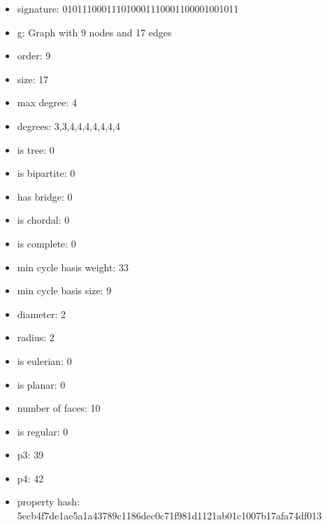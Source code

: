 \newpage
\begin{figure}
\end{figure}
\begin{itemize}
\item signature: 010111000111010001110001100001001011
\item g: Graph with 9 nodes and 17 edges
\item order: 9
\item size: 17
\item max degree: 4
\item degrees: 3,3,4,4,4,4,4,4,4
\item is tree: 0
\item is bipartite: 0
\item has bridge: 0
\item is chordal: 0
\item is complete: 0
\item min cycle basis weight: 33
\item min cycle basis size: 9
\item diameter: 2
\item radius: 2
\item is eulerian: 0
\item is planar: 0
\item number of faces: 10
\item is regular: 0
\item p3: 39
\item p4: 42
\item property hash: 5ecb4f7de1ae5a1a43789c1186dec0c71f981d1121ab01c1007b17afa74df013
\end{itemize}
